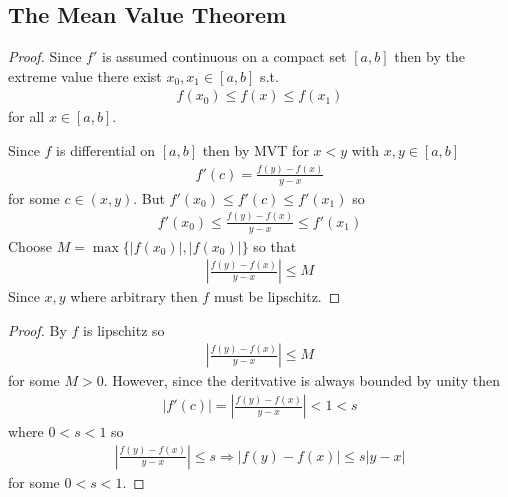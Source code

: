 \subsection{The Mean Value Theorem}

\begin{proof}
    Since $f'$ is assumed continuous on a compact set $[a,b]$
    then by the extreme value \Thm there exist $x_0, x_1 \in [a,b]$
    s.t. 
    \begin{align*}
        f(x_0) \leq f(x) \leq f(x_1)
    \end{align*}
    for all $x\in [a,b]$.

    Since $f$ is differential on $[a,b]$ then by MVT
    for $x<y$ with $x,y\in [a,b]$
    \begin{align*}
        f'(c) = \frac{f(y)-f(x)}{y-x} 
    \end{align*}
    for some $c \in (x,y)$. But $f'(x_0) \leq f'(c) \leq f'(x_1)$
    so 
    \begin{align*}
        f'(x_0) \leq  \frac{f(y)-f(x)}{y-x} \leq f'(x_1) 
    \end{align*}
    Choose $M = \max\{|f(x_0)| ,|f(x_0)|\}$ so that 
    \begin{align*}
        |\frac{f(y)-f(x)}{y-x}| \leq M
    \end{align*}
    Since $x,y$ where arbitrary then $f$ must be lipschitz.
\end{proof}

\begin{proof}
    By  $f$ is lipschitz so 
    \begin{align*}
        |\frac{f(y)-f(x)}{y-x}| \leq M
    \end{align*}
    for some $M>0$.
    However, since the deritvative is always bounded by unity 
    then 
    \begin{align*}
        |f'(c)| = |\frac{f(y)-f(x)}{y-x}| < 1 < s
    \end{align*}
    where $0<s<1$ so 
    \begin{gather*}
        |\frac{f(y)-f(x)}{y-x}| \leq s
        \Rightarrow |f(y)-f(x)| \leq s |y-x|
    \end{gather*}
    for some $0<s<1$.
\end{proof}

